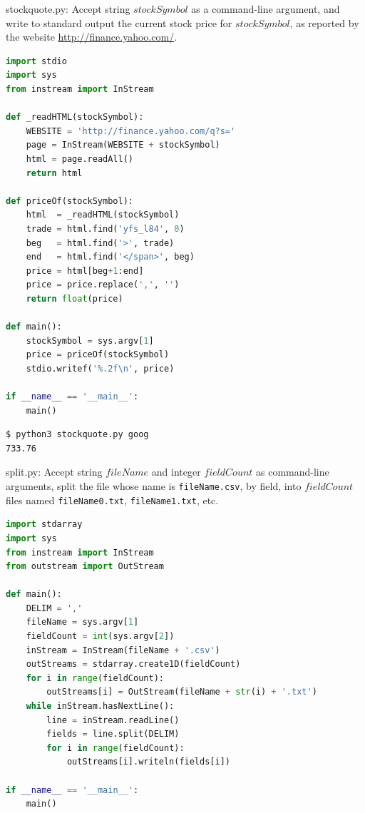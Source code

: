 \documentclass[8pt,a4paper,compress]{beamer}
\begin{document}
\begin{frame}[fragile]
\pause

\begin{framed}
\tiny stockquote.py: Accept string $stockSymbol$ as a command-line argument, and write to standard output the current stock price for $stockSymbol$, as reported by the website \href{http://finance.yahoo.com/}{http://finance.yahoo.com/}.
\end{framed}

\begin{lstlisting}[language=Python,style=focusin]
import stdio
import sys
from instream import InStream

def _readHTML(stockSymbol):
    WEBSITE = 'http://finance.yahoo.com/q?s='
    page = InStream(WEBSITE + stockSymbol)
    html = page.readAll()
    return html

def priceOf(stockSymbol):
    html  = _readHTML(stockSymbol)
    trade = html.find('yfs_l84', 0)
    beg   = html.find('>', trade)
    end   = html.find('</span>', beg)
    price = html[beg+1:end]
    price = price.replace(',', '')
    return float(price)

def main():
    stockSymbol = sys.argv[1]
    price = priceOf(stockSymbol)
    stdio.writef('%.2f\n', price)

if __name__ == '__main__':
    main()
\end{lstlisting}

\pause
\bigskip

\begin{lstlisting}[language={},style=focusin]
$ python3 stockquote.py goog
733.76
\end{lstlisting}
\end{frame}

\begin{frame}[fragile]
\pause

\begin{framed}
\tiny split.py: Accept string $fileName$ and integer $fieldCount$ as command-line arguments, split the file whose name is \lstinline{fileName.csv}, by field, into $fieldCount$ files named \lstinline{fileName0.txt}, \lstinline{fileName1.txt}, etc.
\end{framed}

\begin{lstlisting}[language=Python,style=focusin]
import stdarray
import sys
from instream import InStream
from outstream import OutStream

def main():
    DELIM = ','
    fileName = sys.argv[1]
    fieldCount = int(sys.argv[2])
    inStream = InStream(fileName + '.csv')
    outStreams = stdarray.create1D(fieldCount)
    for i in range(fieldCount):
        outStreams[i] = OutStream(fileName + str(i) + '.txt')
    while inStream.hasNextLine():
        line = inStream.readLine()
        fields = line.split(DELIM)
        for i in range(fieldCount):
            outStreams[i].writeln(fields[i])

if __name__ == '__main__':
    main()
\end{lstlisting}
\end{frame}
\end{document}
